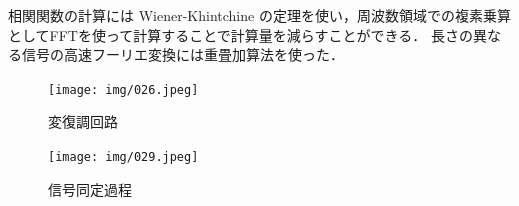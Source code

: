 相関関数の計算には Wiener-Khintchine の定理を使い，周波数領域での複素乗算としてFFTを使って計算することで計算量を減らすことができる．
長さの異なる信号の高速フーリエ変換には重畳加算法\cite{overwrap}を使った．


\begin{figure}[p]
  \centering
  \texttt{[image: img/026.jpeg]}
  \caption{変復調回路}\label{fig:henpuku}
\end{figure}


\begin{figure}[p]
  \centering
  \texttt{[image: img/029.jpeg]}
  \caption{信号同定過程}\label{fig:shousai}
\end{figure}




\clearpage
